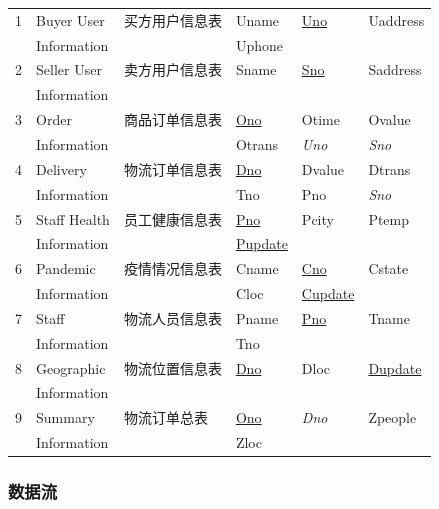\documentclass[12pt]{article}
\begin{document}
\begin{center}
\begin{supertabular}{llllll}
1 &	Buyer User &	买方用户信息表 & Uname &	\underline{Uno} &	Uaddress  \\ & Information &&	Uphone && \\
2 &	Seller User &	卖方用户信息表 & Sname &	\underline{Sno} &	Saddress \\ & Information &&&& \\
3 &	Order  & 商品订单信息表 &	\underline{Ono} &	Otime &	Ovalue  \\
& Information &&	Otrans & \textit{Uno} &	\textit{Sno}  \\
4 &	Delivery &	物流订单信息表 &	\underline{Dno} &	Dvalue &	Dtrans  \\ & Information && Tno &	Pno & \textit{Sno} \\
5 &	Staff Health &	员工健康信息表 &	\underline{Pno} &	Pcity & Ptemp \\ 
& Information && \underline{Pupdate} && \\
6 &	Pandemic &	疫情情况信息表 &	Cname &	\underline{Cno} &	Cstate \\	& Information &&  Cloc & \underline{Cupdate}	& \\
7 &Staff  &	物流人员信息表 &	Pname &	\underline{Pno} &	Tname \\ & Information	& & Tno && \\
8 &	Geographic  &	物流位置信息表 &	\underline{Dno} &	Dloc &	\underline{Dupdate} \\& Information&&&& \\
9 & Summary & 物流订单总表 & \underline{Ono} & \textit{Dno} & Zpeople \\ & Information && Zloc && \\
\end{supertabular}
\end{center}

\subsubsection{数据流}

\tabletail{\bottomrule}
\end{document}
